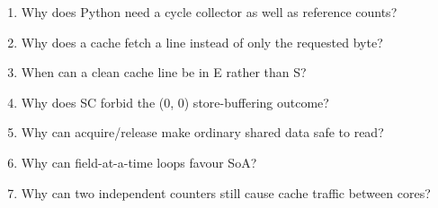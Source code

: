\documentclass[11pt]{article}
\begin{document}
\begin{keepsection}
\begin{enumerate}
\item Why does Python need a cycle collector as well as reference counts?
\item Why does a cache fetch a line instead of only the requested byte?
\item When can a clean cache line be in E rather than S?
\item Why does SC forbid the (0, 0) store-buffering outcome?
\item Why can acquire/release make ordinary shared data safe to read?
\item Why can field-at-a-time loops favour SoA?
\item Why can two independent counters still cause cache traffic between cores?
\end{enumerate}

\end{keepsection}

\clearpage
\end{document}
